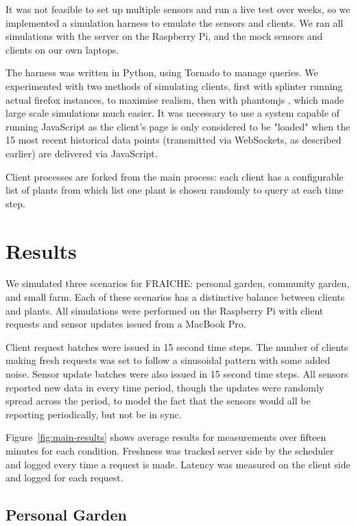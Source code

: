 \documentclass[a4paper]{acm_proc_article-sp}
\begin{document}
It was not feasible to set up multiple sensors and run a live test over weeks, so we implemented a simulation harness to emulate the sensors and clients.  We ran all simulations with the server on the Raspberry Pi, and the mock sensors and clients on our own laptops. 

The harness was written in Python, using Tornado to manage queries.  We experimented with two methods of simulating clients, first with splinter \cite{} running actual firefox instances, to maximise realism, then with phantomjs \cite{}, which made large scale simulations much easier.  It was necessary to use a system capable of running JavaScript as the client's page is only considered to be "loaded" when the 15 most recent historical data points (transmitted via WebSockets, as described earlier) are delivered via JavaScript.

Client processes are forked from the main process: each client has a configurable list of plants from which list one plant is chosen randomly to query at each time step.  

\section{Results}

We simulated three scenarios for FRAICHE: personal garden, community garden, and small farm.  Each of these scenarios has a distinctive balance between clients and plants.  All simulations were performed on the Raspberry Pi with client requests and sensor updates issued from a MacBook Pro.

Client request batches were issued in 15 second time steps.  The number of clients making fresh requests was set to follow a sinusoidal pattern with some added noise.  Sensor update batches were also issued in 15 second time steps.  All sensors reported new data in every time period, though the updates were randomly spread across the period, to model the fact that the sensors would all be reporting periodically, but not be in sync.

Figure~\ref{fig:main-results} shows average results for measurements over fifteen minutes for each condition.  Freshness was tracked server side by the scheduler and logged every time a request is made.  Latency was measured on the client side and logged for each request.

\subsection{Personal Garden}
\end{document}
